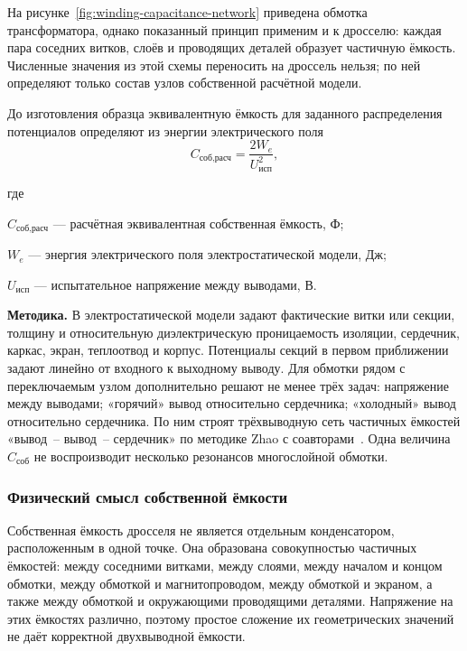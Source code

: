 \documentclass[14pt,a4paper]{extarticle}
\newcommand{\method}{\par\noindent\textbf{Методика.} }
\newenvironment{whereblock}
 {\par\noindent где\par
  \begin{list}{}{\setlength{\leftmargin}{12.5mm}
                  \setlength{\itemindent}{-12.5mm}
                  \setlength{\itemsep}{0pt}
                  \setlength{\parsep}{0pt}
                  \setlength{\topsep}{0pt}}}
 {\end{list}}
\newcommand{\whereitem}[2]{\item[] #1 --- #2}
\begin{document}
На рисунке~\ref{fig:winding-capacitance-network} приведена обмотка
трансформатора, однако показанный принцип применим и к дросселю: каждая
пара соседних витков, слоёв и проводящих деталей образует частичную
ёмкость. Численные значения из этой схемы переносить на дроссель нельзя;
по ней определяют только состав узлов собственной расчётной модели.

До изготовления образца эквивалентную ёмкость для заданного распределения
потенциалов определяют из энергии электрического поля
\begin{equation}
 C_{\text{соб,расч}}=
 \frac{2W_e}{U_{\text{исп}}^2},
 \label{eq:self-capacitance-energy}
\end{equation}
\begin{whereblock}
\whereitem{$C_{\text{соб,расч}}$}{расчётная эквивалентная собственная
ёмкость, Ф;}
\whereitem{$W_e$}{энергия электрического поля электростатической модели,
Дж;}
\whereitem{$U_{\text{исп}}$}{испытательное напряжение между выводами,
В.}
\end{whereblock}

\method В электростатической модели задают фактические витки или секции,
толщину и относительную диэлектрическую проницаемость изоляции, сердечник,
каркас, экран, теплоотвод и корпус. Потенциалы секций в первом приближении
задают линейно от входного к выходному выводу. Для обмотки рядом с
переключаемым узлом дополнительно решают не менее трёх задач: напряжение между
выводами; «горячий» вывод относительно сердечника; «холодный» вывод
относительно сердечника. По ним строят трёхвыводную сеть частичных ёмкостей
«вывод~-- вывод~-- сердечник» по методике Zhao с
соавторами~\cite{zhao}. Одна величина $C_{\text{соб}}$ не воспроизводит
несколько резонансов многослойной обмотки.

\subsubsection{Физический смысл собственной ёмкости}

Собственная ёмкость дросселя не является отдельным конденсатором,
расположенным в одной точке. Она образована совокупностью частичных ёмкостей:
между соседними витками, между слоями, между началом и концом обмотки, между
обмоткой и магнитопроводом, между обмоткой и экраном, а также между обмоткой и
окружающими проводящими деталями. Напряжение на этих ёмкостях различно,
поэтому простое сложение их геометрических значений не даёт корректной
двухвыводной ёмкости.
\end{document}
